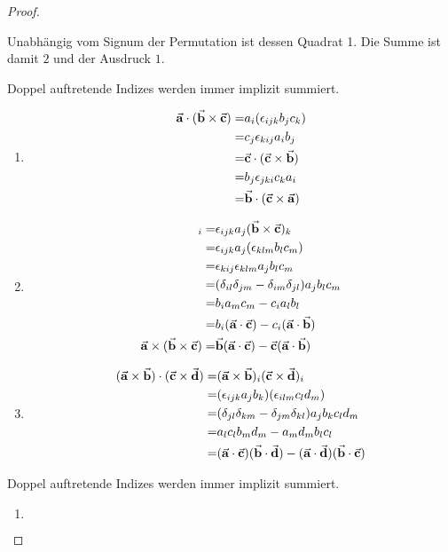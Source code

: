 \begin{proof}
\begin{parts}
	Unabhängig vom Signum der Permutation ist dessen Quadrat 1. Die Summe ist damit $2$ und der Ausdruck $1$.
\item Doppel auftretende Indizes werden immer implizit summiert.
	\begin{enumerate}[label=(\roman*)]
		\item 
			\begin{align*}
				\va a\cdot (\va b\times \va c)=& a_i(\epsilon_{ijk}b_jc_k)\\
				=&c_j\epsilon_{kij}a_ib_j\\
				=&\va c\cdot (\va c\times \va b)\\
				=&b_j\epsilon_{jki}c_ka_i\\
				=&\va b\cdot(\va c\times \va a)
			\end{align*}
		\item 
			\begin{align*}
				[\va a\times(\va b\times \va c)]_i =&\epsilon_{ijk}a_j(\va b\times \va c)_k\\
				=&\epsilon_{ijk}a_j(\epsilon_{klm}b_lc_m)\\
				=&\epsilon_{kij}\epsilon_{klm}a_jb_lc_m\\
				=&(\delta_{il}\delta_{jm}-\delta_{im}\delta_{jl})a_jb_lc_m\\
				=&b_ia_mc_m-c_ia_lb_l\\
				=&b_i(\va a\cdot\va c)-c_i(\va a\cdot\va b)\\
				\va a\times(\va b\times\va c)=&\va b(\va a\cdot\va c)-\va c(\va a \cdot\va b)
			\end{align*}
		\item 
			\begin{align*}
				(\va a\times \va b)\cdot (\va c\times \va d)=&(\va a\times \va b)_i(\va c\times \va d)_i\\
				=&(\epsilon_{ijk}a_jb_k)(\epsilon_{ilm}c_ld_m)\\
				=&(\delta_{jl}\delta_{km}-\delta_{jm}\delta_{kl})a_jb_kc_ld_m\\
				=&a_lc_lb_md_m-a_md_mb_lc_l\\
				=&(\va a\cdot\va c)(\va b\cdot \va d)-(\va a\cdot\va d)(\va b\cdot\va c)
			\end{align*}
	\end{enumerate}
\item Doppel auftretende Indizes werden immer implizit summiert.
	\begin{enumerate}[label=(\roman*)]
		\item 
			\begin{align*}

\end{align*}
\end{enumerate}
\end{parts}
\end{proof}
